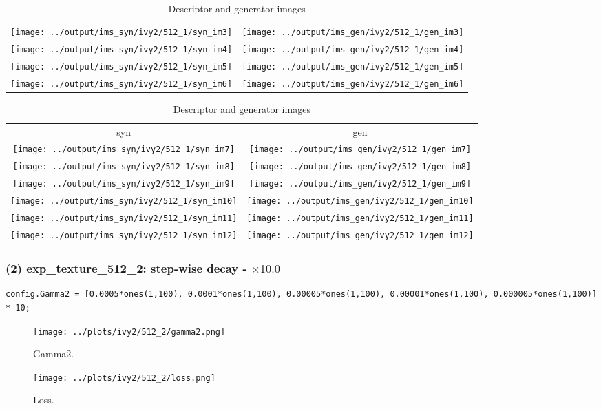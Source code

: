 \documentclass[letter]{article}
\begin{document}
\begin{table}[h!]
\begin{tabular}{cc}
		\texttt{[image: ../output/ims\_syn/ivy2/512\_1/syn\_im3]} & \texttt{[image: ../output/ims\_gen/ivy2/512\_1/gen\_im3]} \tabularnewline
		\texttt{[image: ../output/ims\_syn/ivy2/512\_1/syn\_im4]} & \texttt{[image: ../output/ims\_gen/ivy2/512\_1/gen\_im4]} \tabularnewline
		\texttt{[image: ../output/ims\_syn/ivy2/512\_1/syn\_im5]} & \texttt{[image: ../output/ims\_gen/ivy2/512\_1/gen\_im5]} \tabularnewline
		\texttt{[image: ../output/ims\_syn/ivy2/512\_1/syn\_im6]} & \texttt{[image: ../output/ims\_gen/ivy2/512\_1/gen\_im6]} \tabularnewline
	\end{tabular}
	\begin{tabular}{cc}
		syn & gen\tabularnewline
		\texttt{[image: ../output/ims\_syn/ivy2/512\_1/syn\_im7]} & \texttt{[image: ../output/ims\_gen/ivy2/512\_1/gen\_im7]} \tabularnewline
		\texttt{[image: ../output/ims\_syn/ivy2/512\_1/syn\_im8]} & \texttt{[image: ../output/ims\_gen/ivy2/512\_1/gen\_im8]} \tabularnewline
		\texttt{[image: ../output/ims\_syn/ivy2/512\_1/syn\_im9]} & \texttt{[image: ../output/ims\_gen/ivy2/512\_1/gen\_im9]} \tabularnewline
		\texttt{[image: ../output/ims\_syn/ivy2/512\_1/syn\_im10]} & \texttt{[image: ../output/ims\_gen/ivy2/512\_1/gen\_im10]} \tabularnewline
		\texttt{[image: ../output/ims\_syn/ivy2/512\_1/syn\_im11]} & \texttt{[image: ../output/ims\_gen/ivy2/512\_1/gen\_im11]} \tabularnewline
		\texttt{[image: ../output/ims\_syn/ivy2/512\_1/syn\_im12]} & \texttt{[image: ../output/ims\_gen/ivy2/512\_1/gen\_im12]} \tabularnewline
	\end{tabular}
	\caption{Descriptor and generator images}
\end{table}

\newpage

\subsubsection*{(2) exp\_texture\_512\_2: step-wise decay - $\times10.0$}

\begin{lstlisting}
config.Gamma2 = [0.0005*ones(1,100), 0.0001*ones(1,100), 0.00005*ones(1,100), 0.00001*ones(1,100), 0.000005*ones(1,100)] * 10;
\end{lstlisting}

\begin{figure}[h!]
	\centering
	\texttt{[image: ../plots/ivy2/512\_2/gamma2.png]}
	\caption{\label{fig:gamma1}Gamma2.}
\end{figure}

\begin{figure}[h!]
	\centering
	\texttt{[image: ../plots/ivy2/512\_2/loss.png]}
	\caption{\label{fig:gamma1}Loss.}
\end{figure}
\end{document}
